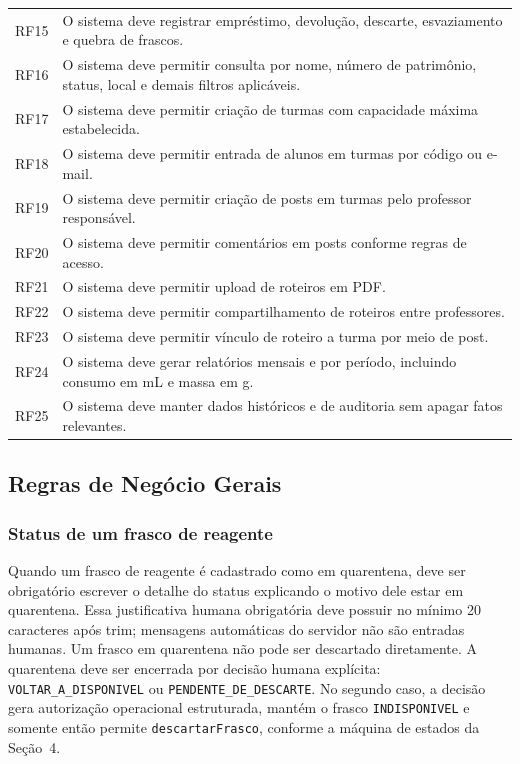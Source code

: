 \begin{longtable}{p{} p{}}
RF15 & O sistema deve registrar empréstimo, devolução, descarte, esvaziamento e quebra de frascos.\\
RF16 & O sistema deve permitir consulta por nome, número de patrimônio, status, local e demais filtros aplicáveis.\\
RF17 & O sistema deve permitir criação de turmas com capacidade máxima estabelecida.\\
RF18 & O sistema deve permitir entrada de alunos em turmas por código ou e-mail.\\
RF19 & O sistema deve permitir criação de posts em turmas pelo professor responsável.\\
RF20 & O sistema deve permitir comentários em posts conforme regras de acesso.\\
RF21 & O sistema deve permitir upload de roteiros em PDF.\\
RF22 & O sistema deve permitir compartilhamento de roteiros entre professores.\\
RF23 & O sistema deve permitir vínculo de roteiro a turma por meio de post.\\
RF24 & O sistema deve gerar relatórios mensais e por período, incluindo consumo em mL e massa em g.\\
RF25 & O sistema deve manter dados históricos e de auditoria sem apagar fatos relevantes.\\
\bottomrule
\end{longtable}

\subsection{Regras de Negócio Gerais}
\subsubsection{Status de um frasco de reagente}
\begin{regra}
Quando um frasco de reagente é cadastrado como em quarentena, deve ser obrigatório escrever o detalhe do status explicando o motivo dele estar em quarentena. Essa justificativa humana obrigatória deve possuir no mínimo 20 caracteres após trim; mensagens automáticas do servidor não são entradas humanas.
Um frasco em quarentena não pode ser descartado diretamente. A quarentena deve ser encerrada por decisão humana explícita: \texttt{VOLTAR\_A\_DISPONIVEL} ou \texttt{PENDENTE\_DE\_DESCARTE}. No segundo caso, a decisão gera autorização operacional estruturada, mantém o frasco \texttt{INDISPONIVEL} e somente então permite \texttt{descartarFrasco}, conforme a máquina de estados da Seção~4.
\end{regra}


